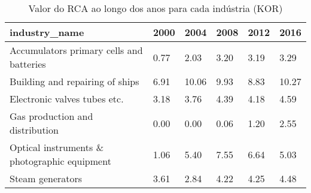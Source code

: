 \begin{table}
\centering
\caption{Valor do RCA ao longo dos anos para cada indústria (KOR)}
\begin{tabular}{p{6cm}p{1.5cm}p{1.5cm}p{1.5cm}p{1.5cm}p{1.5cm}}
\toprule
                               industry\_name & 2000 &  2004 & 2008 & 2012 &  2016 \\
\midrule
    Accumulators primary cells and batteries & 0.77 &  2.03 & 3.20 & 3.19 &  3.29 \\
             Building and repairing of ships & 6.91 & 10.06 & 9.93 & 8.83 & 10.27 \\
                Electronic valves tubes etc. & 3.18 &  3.76 & 4.39 & 4.18 &  4.59 \\
             Gas production and distribution & 0.00 &  0.00 & 0.06 & 1.20 &  2.55 \\
Optical instruments \& photographic equipment & 1.06 &  5.40 & 7.55 & 6.64 &  5.03 \\
                            Steam generators & 3.61 &  2.84 & 4.22 & 4.25 &  4.48 \\
\bottomrule
\end{tabular}
\end{table}
